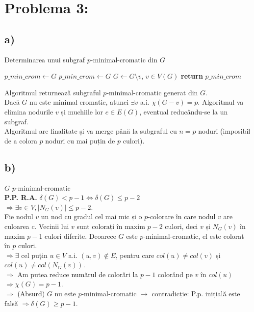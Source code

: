 \documentclass[a4paper,12pt]{article}
\begin{document}
\section*{Problema 3:}

\subsection*{a)}

\begin{algorithm}
\caption{Determinarea unui subgraf $p$-minimal-cromatic din $G$}
\begin{algorithmic}[1]
\State $p\_min\_crom \gets G$
    \State $p\_min\_crom \gets G$
    \State $G \gets G \setminus v$, $v \in V(G)$
\EndWhile
\State \textbf{return} $p\_min\_crom$
\end{algorithmic}
\end{algorithm}


Algoritmul returnează subgraful $p$-minimal-cromatic generat din $G$. \\

Dacă $G$ nu este minimal cromatic, atunci $\exists v$ a.i. $\chi(G - v) = p$. 
Algoritmul va elimina nodurile $v$ și muchiile lor $e \in E(G)$, 
eventual reducându-se la un subgraf. \\

Algoritmul are finalitate și va merge până la subgraful cu $n = p$ noduri (imposibil de a colora $p$ noduri cu mai puțin de $p$ culori).

\subsection*{b)}
$G$ $p$-minimal-cromatic \\
\textbf{P.P. R.A.} $\delta(G) < p - 1 \Longleftrightarrow \delta(G) \leq p - 2$ \\
$\Longrightarrow \exists v \in V, |N_G(v)| \leq p - 2$. \\

Fie nodul $v$ un nod cu gradul cel mai mic și o $p$-colorare în care nodul $v$ are culoarea $c$. Vecinii lui $v$ sunt colorați în maxim $p-2$ culori, deci $v$ și $N_G(v)$ în maxim $p-1$ culori diferite. Deoarece $G$ este $p$-minimal-cromatic, el este colorat în $p$ culori. \\
$\Longrightarrow \exists$ cel puțin $u \in V$ a.i. $(u, v) \notin E$, pentru care $col(u) \ne col(v)$ și $col(u) \ne col(N_G(v))$. \\
$\Longrightarrow$ Am putea reduce numărul de colorări la $p-1$ colorând pe $v$ în $col(u)$ $\Longrightarrow \chi(G) = p-1$. \\
$\Longrightarrow$ (Absurd) $G$ nu este $p$-minimal-cromatic $\longrightarrow$ contradicție: P.p. inițială este falsă $\Longrightarrow \delta(G) \geq p-1$.
\end{document}
